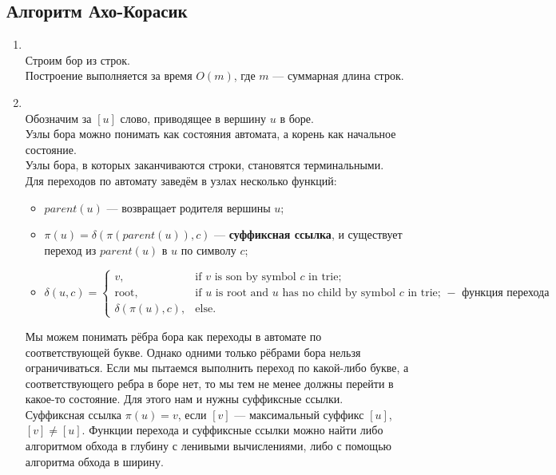     \subsection{Алгоритм Ахо-Корасик}
        \begin{enumerate}[label=\textbf{\arabic* Шаг}:]
            \item {}\\
            Строим бор из строк.\\
            Построение выполняется за время $O(m)$, где $m$ — суммарная длина строк.
            \item {}\\
            
            Обозначим за $[u]$ слово, приводящее в вершину $u$ в боре.\\
            Узлы бора можно понимать как состояния автомата, а корень как начальное состояние.\\
            Узлы бора, в которых заканчиваются строки, становятся терминальными.\\
            Для переходов по автомату заведём в узлах несколько функций:
            
            \begin{itemize}
              \item $parent(u)$ --- возвращает родителя вершины $u$;
              \item $\pi(u) = \delta(\pi(parent(u)), c)$ --- \textbf{суффиксная ссылка}, и существует переход из $parent(u)$ в $u$ по символу $c$;
              \item $\delta(u,c) = \begin{cases}
                  v, & \text{if $v$ is son by symbol $c$ in trie;} \\
                  \text{root}, & \text{if $u$ is root and $u$ has no child by symbol $c$ in trie; $-$ функция перехода}\\
                  \delta(\pi(u), c), & \text{else.}
                \end{cases}$
            \end{itemize}
            
            Мы можем понимать рёбра бора как переходы в автомате по соответствующей букве. Однако одними только рёбрами бора нельзя ограничиваться. Если мы пытаемся выполнить переход по какой-либо букве, а соответствующего ребра в боре нет, то мы тем не менее должны перейти в какое-то состояние. Для этого нам и нужны суффиксные ссылки.\\ 
            Суффиксная ссылка $\pi(u) = v$, если $[v]$ --- максимальный суффикс $[u]$, $[v] \neq [u]$. Функции перехода и суффиксные ссылки можно найти либо алгоритмом обхода в глубину с ленивыми вычислениями, либо с помощью алгоритма обхода в ширину.\\
            

\end{enumerate}
